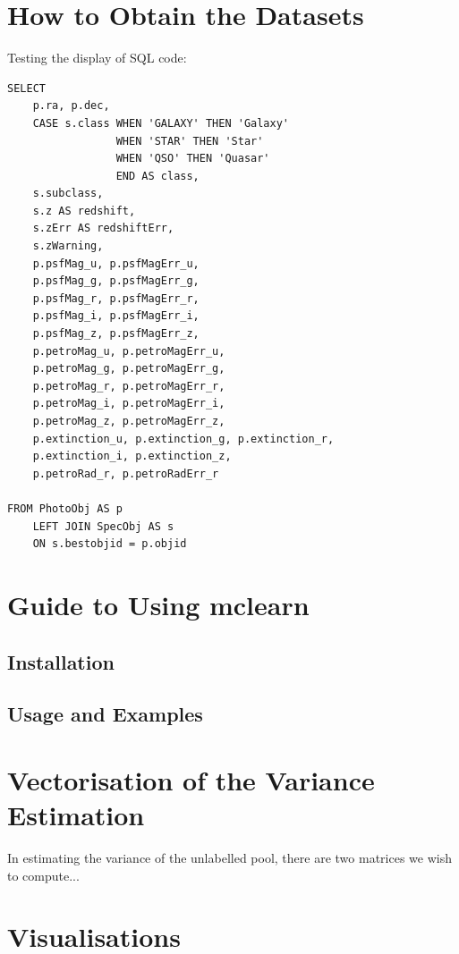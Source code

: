 
\appendix

\chapter{How to Obtain the Datasets}
\label{cha:datasets}

Testing the display of SQL code:

\begin{verbatim}
SELECT
	p.ra, p.dec,
	CASE s.class WHEN 'GALAXY' THEN 'Galaxy'
				 WHEN 'STAR' THEN 'Star'
				 WHEN 'QSO' THEN 'Quasar'
				 END AS class,
	s.subclass,
	s.z AS redshift,
	s.zErr AS redshiftErr,
	s.zWarning,
	p.psfMag_u, p.psfMagErr_u,
	p.psfMag_g, p.psfMagErr_g,
	p.psfMag_r, p.psfMagErr_r,
	p.psfMag_i, p.psfMagErr_i,
	p.psfMag_z, p.psfMagErr_z,
	p.petroMag_u, p.petroMagErr_u,
	p.petroMag_g, p.petroMagErr_g,
	p.petroMag_r, p.petroMagErr_r,
	p.petroMag_i, p.petroMagErr_i,
	p.petroMag_z, p.petroMagErr_z,
	p.extinction_u, p.extinction_g, p.extinction_r,
	p.extinction_i, p.extinction_z,
	p.petroRad_r, p.petroRadErr_r

FROM PhotoObj AS p
	LEFT JOIN SpecObj AS s
	ON s.bestobjid = p.objid
\end{verbatim}


\chapter{Guide to Using mclearn}
\label{cha:mclearn}

\section{Installation}
\label{sec:installation}

\section{Usage and Examples}
\label{sec:usage}


\chapter{Vectorisation of the Variance Estimation}
\label{cha:vectorise}

In estimating the variance of the unlabelled pool, there are two matrices we wish to compute...


\chapter{Visualisations}

